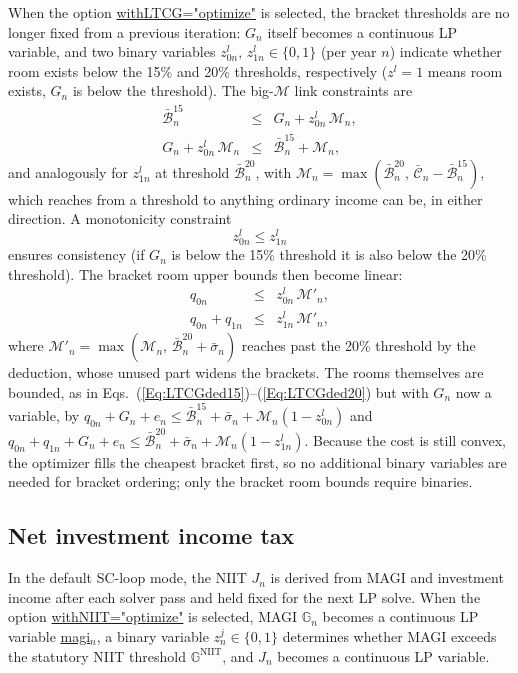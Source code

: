 \documentclass[fleqn,12pt]{report}
\newcommand{\code}[1]{\url{#1}}
\begin{document}
	When the option \code{withLTCG="optimize"} is selected, the bracket thresholds
	are no longer fixed from a previous iteration: $G_n$ itself becomes a continuous
	LP variable, and two binary variables $z^l_{0n},\,z^l_{1n} \in \{0,1\}$
	(per year $n$) indicate whether room exists below the 15\% and 20\% thresholds,
	respectively ($z^l = 1$ means room exists, $G_n$ is below the threshold).
	The big-$\mathcal{M}$ link constraints are
	\begin{eqnarray}
		\bar{\mathcal{B}}^{15}_n &\le& G_n + z^l_{0n}\,\mathcal{M}_n, \label{Eq:LTCGm1} \\
		G_n + z^l_{0n}\,\mathcal{M}_n &\le& \bar{\mathcal{B}}^{15}_n + \mathcal{M}_n, \label{Eq:LTCGm2}
	\end{eqnarray}
	and analogously for $z^l_{1n}$ at threshold $\bar{\mathcal{B}}^{20}_n$,
	with $\mathcal{M}_n = \max(\bar{\mathcal{B}}^{20}_n,\,\bar{\mathcal{C}}_n - \bar{\mathcal{B}}^{15}_n)$,
	which reaches from a threshold to anything ordinary income can be, in either direction.
	A monotonicity constraint
	\begin{equation}
		z^l_{0n} \le z^l_{1n}
	\end{equation}
	ensures consistency (if $G_n$ is below the 15\% threshold it is also below the 20\% threshold).
	The bracket room upper bounds then become linear:
	\begin{eqnarray}
		q_{0n} &\le& z^l_{0n}\,\mathcal{M}'_n, \label{Eq:LTCGmq1} \\
		q_{0n} + q_{1n} &\le& z^l_{1n}\,\mathcal{M}'_n, \label{Eq:LTCGmq2}
	\end{eqnarray}
	where $\mathcal{M}'_n = \max(\mathcal{M}_n,\,\bar{\mathcal{B}}^{20}_n + \bar{\sigma}_n)$ reaches
	past the 20\% threshold by the deduction, whose unused part widens the brackets.
	The rooms themselves are bounded, as in Eqs.~(\ref{Eq:LTCGded15})--(\ref{Eq:LTCGded20}) but
	with $G_n$ now a variable, by
	$q_{0n} + G_n + e_n \le \bar{\mathcal{B}}^{15}_n + \bar{\sigma}_n + \mathcal{M}_n(1 - z^l_{0n})$
	and
	$q_{0n} + q_{1n} + G_n + e_n \le \bar{\mathcal{B}}^{20}_n + \bar{\sigma}_n + \mathcal{M}_n(1 - z^l_{1n})$.
	Because the cost is still convex, the optimizer fills the cheapest bracket first,
	so no additional binary variables are needed for bracket ordering;
	only the bracket room bounds require binaries.

\subsection{Net investment income tax}
\label{Sec:NIIT}
	In the default SC-loop mode, the NIIT $J_n$ is derived from MAGI and
	investment income after each solver pass and held fixed for the next LP solve.
	When the option \code{withNIIT="optimize"} is selected, MAGI $\mathbb{G}_n$
	becomes a continuous LP variable \code{magi}$_n$, a binary variable
	$z^j_n \in \{0,1\}$ determines whether MAGI exceeds the statutory NIIT
	threshold $\mathbb{G}^{\mathrm{NIIT}}$, and $J_n$ becomes a continuous LP
	variable.
\end{document}
